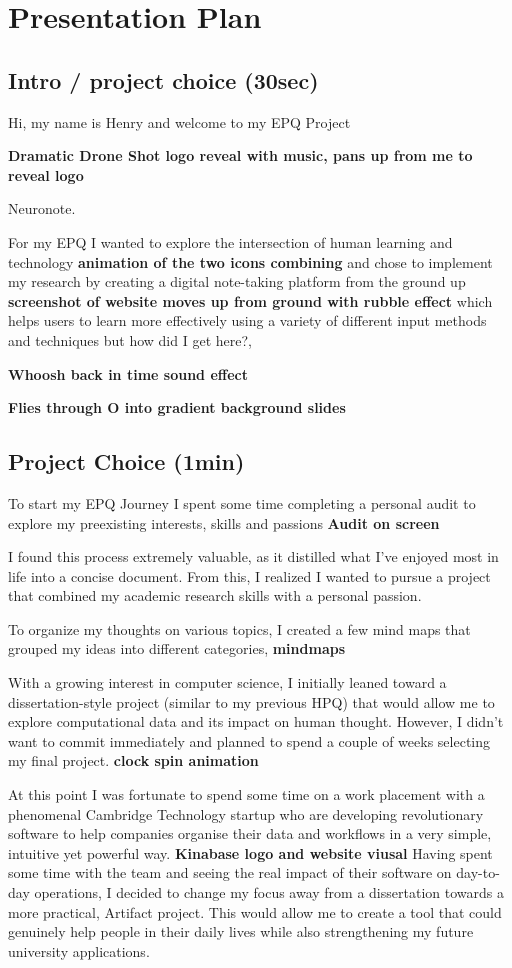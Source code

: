 \section{Presentation Plan}

\subsection*{Intro / project choice (30sec)}
Hi, my name is Henry and welcome to my EPQ Project

\textbf{Dramatic Drone Shot logo reveal with music, pans up from me to reveal logo}

Neuronote.

For my EPQ I wanted to explore the intersection of human learning and technology \textbf{animation of the two icons combining} and chose to implement my research by creating a digital note-taking platform from the ground up \textbf{screenshot of website moves up from ground with rubble effect} which helps users to learn more effectively using a variety of different input methods and techniques but how did I get here?,

\textbf{Whoosh back in time sound effect}

\textbf{Flies through O into gradient background slides}

\subsection*{Project Choice (1min)}
To start my EPQ Journey I spent some time completing a personal audit to explore my preexisting interests, skills and passions \textbf{Audit on screen}

I found this process extremely valuable, as it distilled what I've enjoyed most in life into a concise document. From this, I realized I wanted to pursue a project that combined my academic research skills with a personal passion.

To organize my thoughts on various topics, I created a few mind maps that grouped my ideas into different categories, \textbf{mindmaps}

With a growing interest in computer science, I initially leaned toward a dissertation-style project (similar to my previous HPQ) that would allow me to explore computational data and its impact on human thought. However, I didn't want to commit immediately and planned to spend a couple of weeks selecting my final project. \textbf{clock spin animation}

At this point I was fortunate to spend some time on a work placement with a phenomenal Cambridge Technology startup who are developing revolutionary software to help companies organise their data and workflows in a very simple, intuitive yet powerful way. \textbf{Kinabase logo and website viusal} Having spent some time with the team and seeing the real impact of their software on day-to-day operations,   I decided to change my focus away from a dissertation towards a more practical, Artifact project. This would allow me to create a tool that could genuinely help people in their daily lives while also strengthening my future university applications. 

